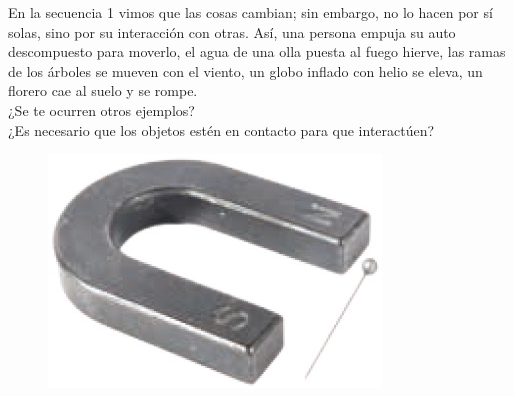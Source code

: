 \documentclass[11pt]{book}
\begin{document}
En la secuencia 1 vimos que las cosas cambian; sin embargo, no lo hacen por sí solas,
sino por su interacción con otras. Así, una persona empuja su auto descompuesto para
moverlo, el agua de una olla puesta al fuego hierve, las ramas de los árboles se mueven
con el viento, un globo inflado con helio se eleva, un florero cae al suelo y se rompe.\\

¿Se te ocurren otros ejemplos?\\
¿Es necesario que los objetos estén en contacto para que interactúen?\\

\begin{minipage}[t]{0.35\textwidth}
  \begin{figure}[H]
    \centering
    \includegraphics[width=\linewidth]{f_magnetica}
    \label{fig:f_magnetica}
  \end{figure}
  \begin{figure}[H]
    \centering

\end{figure}
\end{minipage}
\end{document}
